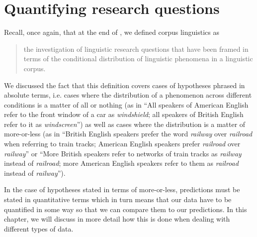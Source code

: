 \chapter{Quantifying research questions}
\label{ch:quantifyingresearch}

Recall, once again, that at the end of , we defined corpus linguistics as

\begin{quotation}
the investigation of linguistic research questions that have been framed in terms of the conditional distribution  of linguistic phenomena in a linguistic corpus.
\end{quotation}

We discussed the fact that this definition covers cases of hypotheses  phrased in absolute terms, i.e. cases where the distribution of a phenomenon across different conditions is a matter of all or nothing (as in ``All speakers of American  English refer to the front window of a car as \textit{windshield}; all speakers of British  English refer to it as \textit{windscreen}'') as well as cases where the distribution is a matter of more\hyp{}or\hyp{}less (as in ``British  English speakers prefer the word \textit{railway} over \textit{railroad} when referring to train tracks; American  English speakers prefer \textit{railroad} over \textit{railway}'' or ``More British speakers refer to networks of train tracks as \textit{railway} instead of \textit{railroad}; more American English speakers refer to them as \textit{railroad} instead of \textit{railway}'').

In the case of hypotheses  stated in terms of more\hyp{}or\hyp{}less, predictions must be stated in quantitative  terms which in turn means that our data have to be quantified in some way so that we can compare them to our predictions. In this chapter, we will discuss in more detail how this is done when dealing with different types of data.


